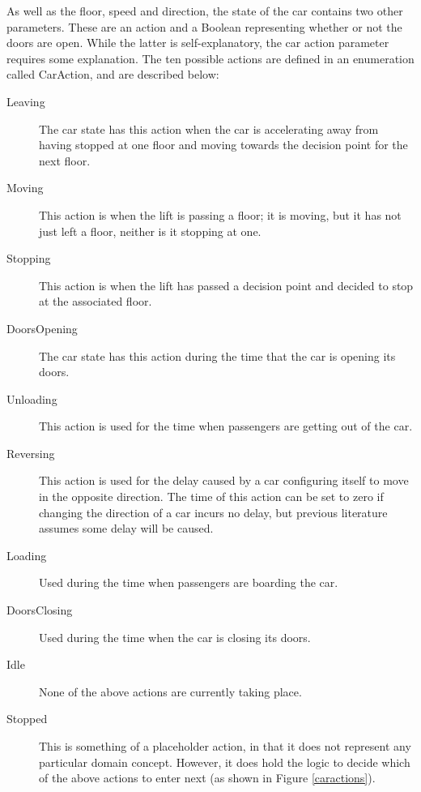 \documentclass{UoYCSproject}
\begin{document}
As well as the floor, speed and direction, the state of the car contains two other parameters.  These are an action and a Boolean representing whether or not the doors are open.  While the latter is self-explanatory, the car action parameter requires some explanation.  The ten possible actions are defined in an enumeration called CarAction, and are described below:
\begin{description}
	\item[Leaving] The car state has this action when the car is accelerating away from having stopped at one floor and moving towards the decision point for the next floor.
	\item[Moving] This action is when the lift is passing a floor; it is moving, but it has not just left a floor, neither is it stopping at one.
	\item[Stopping] This action is when the lift has passed a decision point and decided to stop at the associated floor.
	\item[DoorsOpening] The car state has this action during the time that the car is opening its doors.
	\item[Unloading] This action is used for the time when passengers are getting out of the car.
	\item[Reversing] This action is used for the delay caused by a car configuring itself to move in the opposite direction.  The time of this action can be set to zero if changing the direction of a car incurs no delay, but previous literature assumes some delay will be caused.
	\item[Loading] Used during the time when passengers are boarding the car.
	\item[DoorsClosing] Used during the time when the car is closing its doors.
	\item[Idle] None of the above actions are currently taking place.
	\item[Stopped] This is something of a placeholder action, in that it does not represent any particular domain concept.  However, it does hold the logic to decide which of the above actions to enter next (as shown in Figure \ref{caractions}).
\end{description}
\end{document}
